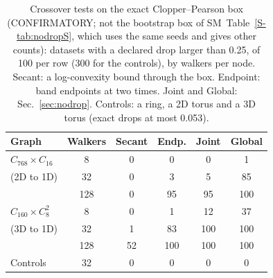 \documentclass[aps,pre,twocolumn,superscriptaddress,nofootinbib,10pt]{revtex4-2}
\newcommand{\SM}{SM}
\begin{document}
\begin{table}[b]
\caption{Crossover tests on the exact Clopper--Pearson box (CONFIRMATORY; not the bootstrap box of \SM\ Table~\ref{S-tab:nodropS}, which uses the same seeds and gives other counts): datasets with a declared drop larger than 0.25, of 100 per row (300 for the controls), by walkers per node. Secant: a log-convexity bound through the box. Endpoint: band endpoints at two times. Joint and Global: Sec.~\ref{sec:nodrop}. Controls: a ring, a 2D torus and a 3D torus (exact drops at most 0.053).}
\label{tab:nodrop}
\begin{ruledtabular}
\begin{tabular}{lccccc}
Graph & Walkers & Secant & Endp. & Joint & Global \\
\hline
$C_{768}\times C_{16}$ & 8 & 0 & 0 & 0 & 1 \\
(2D to 1D) & 32 & 0 & 3 & 5 & 85 \\
 & 128 & 0 & 95 & 95 & 100 \\
$C_{160}\times C_8^2$ & 8 & 0 & 1 & 12 & 37 \\
(3D to 1D) & 32 & 1 & 83 & 100 & 100 \\
 & 128 & 52 & 100 & 100 & 100 \\
Controls & 32 & 0 & 0 & 0 & 0 \\
\end{tabular}
\end{ruledtabular}
\end{table}
\end{document}
